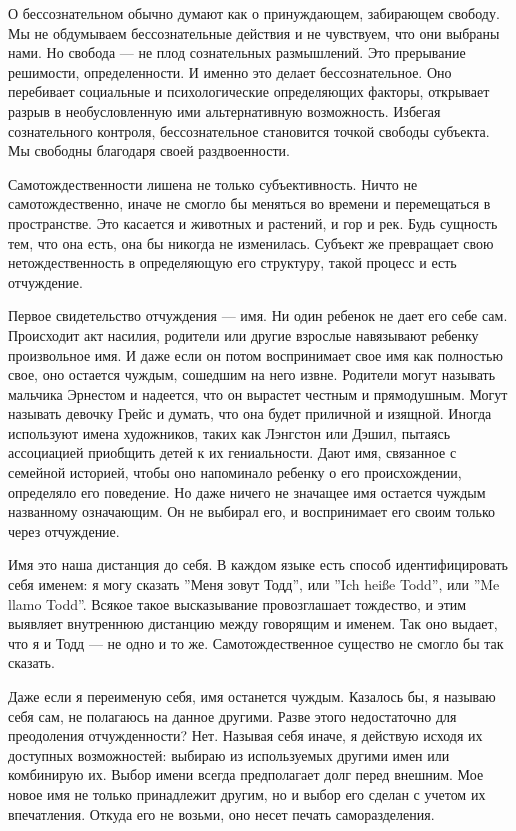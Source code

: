 \documentclass[11pt]{book}
\begin{document}
О бессознательном обычно думают как о принуждающем, забирающем свободу. Мы не обдумываем бессознательные действия и не чувствуем, что они выбраны нами. Но свобода --- не плод сознательных размышлений. Это прерывание решимости, определенности. И именно это делает бессознательное. Оно перебивает социальные и психологические определяющих факторы, открывает разрыв в необусловленную ими альтернативную возможность. Избегая сознательного контроля, бессознательное становится точкой свободы субъекта. Мы свободны благодаря своей раздвоенности.

Самотождественности лишена не только субъективность. Ничто не самотождественно, иначе не смогло бы меняться во времени и перемещаться в пространстве. Это касается и животных и растений, и гор и рек. Будь сущность тем, что она есть, она бы никогда не изменилась. Субъект же превращает свою нетождественность в определяющую его структуру, такой процесс и есть отчуждение.

Первое свидетельство отчуждения --- имя. Ни один ребенок не дает его себе сам. Происходит акт насилия, родители или другие взрослые навязывают ребенку произвольное имя. И даже если он потом воспринимает свое имя как полностью свое, оно остается чуждым, сошедшим на него извне. Родители могут называть мальчика Эрнестом и надеется, что он вырастет честным и прямодушным. Могут называть девочку Грейс и думать, что она будет приличной и изящной. Иногда используют имена художников, таких как Лэнгстон или Дэшил, пытаясь ассоциацией приобщить детей к их гениальности. Дают имя, связанное с семейной историей, чтобы оно напоминало ребенку о его происхождении, определяло его поведение. Но даже ничего не значащее имя остается чуждым названному означающим. Он не выбирал его, и воспринимает его своим только через отчуждение.

Имя это наша дистанция до себя. В каждом языке есть способ идентифицировать себя именем: я могу сказать ''Меня зовут Тодд'', или ''Ich heiße Todd'', или ''Me llamo Todd''. Всякое такое высказывание провозглашает тождество, и этим выявляет внутреннюю дистанцию между говорящим и именем. Так оно выдает, что я и Тодд --- не одно и то же. Самотождественное существо не смогло бы так сказать.

Даже если я переименую себя, имя останется чуждым. Казалось бы, я называю себя сам, не полагаюсь на данное другими. Разве этого недостаточно для преодоления отчужденности? Нет. Называя себя иначе, я действую исходя их доступных возможностей: выбираю из используемых другими имен или комбинирую их. Выбор имени всегда предполагает долг перед внешним. Мое новое имя не только принадлежит другим, но и выбор его сделан с учетом их впечатления. Откуда его не возьми, оно несет печать саморазделения.
\end{document}
